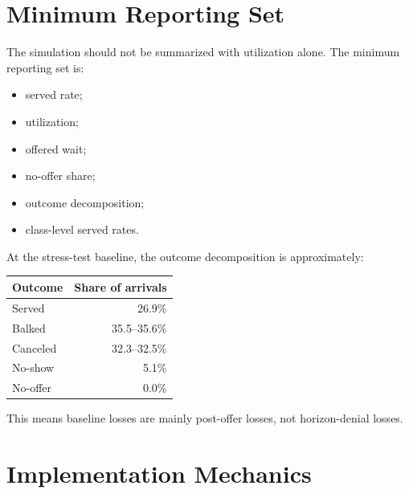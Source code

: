 \documentclass[11pt]{article}
\begin{document}
\section*{Minimum Reporting Set}

The simulation should not be summarized with utilization alone. The minimum
reporting set is:

\begin{itemize}
  \item served rate;
  \item utilization;
  \item offered wait;
  \item no-offer share;
  \item outcome decomposition;
  \item class-level served rates.
\end{itemize}

At the stress-test baseline, the outcome decomposition is approximately:

\begin{center}
\begin{tabular}{lr}
\toprule
Outcome & Share of arrivals \\
\midrule
Served & 26.9\% \\
Balked & 35.5--35.6\% \\
Canceled & 32.3--32.5\% \\
No-show & 5.1\% \\
No-offer & 0.0\% \\
\bottomrule
\end{tabular}
\end{center}

This means baseline losses are mainly post-offer losses, not horizon-denial
losses.

\section*{Implementation Mechanics}
\end{document}
